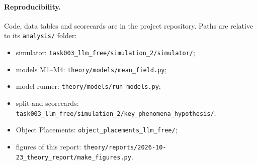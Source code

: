 \documentclass[10pt,a4paper]{article}
\begin{document}
\paragraph{Reproducibility.} Code, data tables and scorecards are in the project repository. Paths are relative
to its \nolinkurl{analysis/} folder:
\begin{itemize}
\item simulator: \nolinkurl{task003_llm_free/simulation_2/simulator/};
\item models M1--M4: \nolinkurl{theory/models/mean_field.py};
\item model runner: \nolinkurl{theory/models/run_models.py};
\item split and scorecards: \nolinkurl{task003_llm_free/simulation_2/key_phenomena_hypothesis/};
\item Object Placements: \nolinkurl{object_placements_llm_free/};
\item figures of this report: \nolinkurl{theory/reports/2026-10-23_theory_report/make_figures.py}.
\end{itemize}
\end{document}
